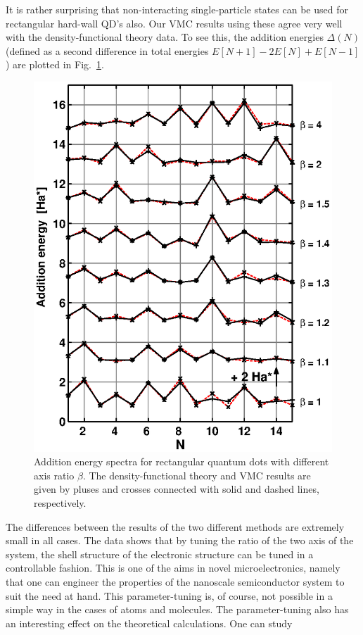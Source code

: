 \documentclass{article}
\begin{document}
It is rather surprising that non-interacting single-particle states
can be used for rectangular hard-wall QD's also\cite{recta}. Our VMC
results using these agree very well with the density-functional theory
data\cite{recta,AetC}. To see this, the addition energies $\Delta(N)$
(defined as a second difference in total energies
$E[N+1]-2E[N]+E[N-1]$) are plotted in Fig.~\ref{EVa}.
%
\begin{figure}[hbt]
\begin{center}
  \includegraphics[width=0.75\columnwidth]{EV}
\end{center}
\caption{Addition energy spectra for rectangular quantum dots with
  different axis ratio $\beta$.  The density-functional theory and VMC
  results are given by pluses and crosses connected with solid and
  dashed lines, respectively.}
\label{EVa}
\end{figure}
%
The differences between the results of the two different methods are
extremely small in all cases. The data shows that by tuning the ratio
of the two axis of the system, the shell structure of the electronic
structure can be tuned in a controllable fashion. This is one of the
aims in novel microelectronics, namely that one can engineer the
properties of the nanoscale semiconductor system to suit the need at
hand. This parameter-tuning is, of course, not possible in a simple
way in the cases of atoms and molecules. The parameter-tuning also has
an interesting effect on the theoretical calculations. One can study
\end{document}
